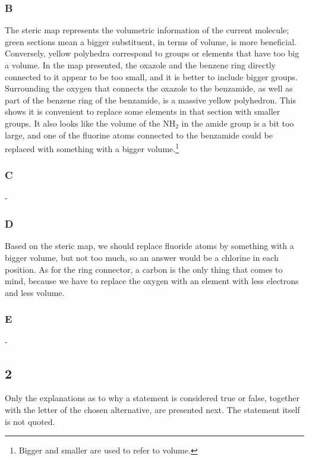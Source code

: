 \documentclass[a4paper, 12pt, notitlepage]{article}
\begin{document}
\subsubsection*{B}
The steric map represents the volumetric information of the current molecule; green sections mean a bigger substituent, in terms of volume, is more beneficial. Conversely, yellow polyhedra correspond to groups or elements that have too big a volume. In the map presented, the oxazole and the benzene ring directly connected to it appear to be too small, and it is better to include bigger groups. Surrounding the oxygen that connects the oxazole to the benzamide, as well as part of the benzene ring of the benzamide, is a massive yellow polyhedron. This shows it is convenient to replace some elements in that section with smaller groups. It also looks like the volume of the NH$_\text{2}$ in the amide group is a bit too large, and one of the fluorine atoms connected to the benzamide could be replaced with something with a bigger volume.\footnote{Bigger and smaller are used to refer to volume.}
\subsubsection*{C}
-
\subsubsection*{D}
Based on the steric map, we should replace fluoride atoms by something with a bigger volume, but not too much, so an answer would be a chlorine in each position. As for the ring connector, a carbon is the only thing that comes to mind, because we have to replace the oxygen with an element with less electrons and less volume.
\subsubsection*{E}
-
\subsection*{2}
Only the explanations as to why a statement is considered true or false, together with the letter of the chosen alternative, are presented next. The statement itself is not quoted.
\end{document}
